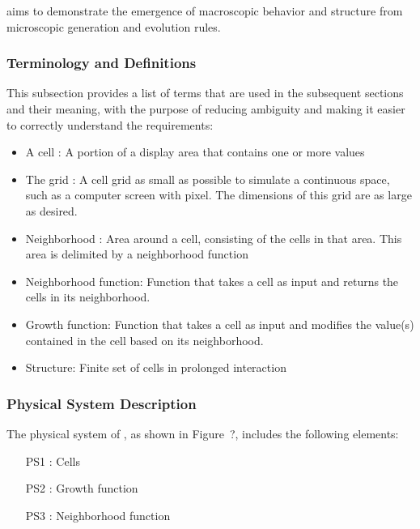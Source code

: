 \documentclass[12pt]{article}
\begin{document}
\progname{} aims to demonstrate the emergence of macroscopic behavior and structure from microscopic generation and evolution rules.

\subsubsection{Terminology and  Definitions}

This subsection provides a list of terms that are used in the subsequent
sections and their meaning, with the purpose of reducing ambiguity and making it
easier to correctly understand the requirements:

\begin{itemize}

\item A cell : A portion of a display area that contains one or more values

\item The grid : A cell grid as small as possible to simulate a continuous space, such as a computer screen with pixel. The dimensions of this grid are as large as desired.

\item Neighborhood : Area around a cell, consisting of the cells in that area. This area is delimited by a neighborhood function

\item Neighborhood function: Function that takes a cell as input and returns the cells in its neighborhood.

\item Growth function: Function that takes a cell as input and modifies the value(s) contained in the cell based on its neighborhood.

\item Structure: Finite set of cells in prolonged interaction

\end{itemize}

\subsubsection{Physical System Description} \label{sec_phySystDescrip}

The physical system of \progname{}, as shown in Figure~?, includes the following elements:

\begin{itemize}

\item[PS1 :] Cells

\item[PS2 :] Growth function

\item[PS3 :] Neighborhood function

\end{itemize}
\end{document}
